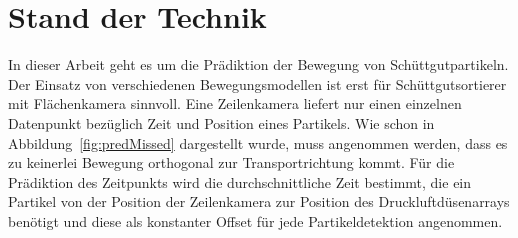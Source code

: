 \section{Stand der Technik}
\label{cap:relWork}








In dieser Arbeit geht es um die Prädiktion der Bewegung von Schüttgutpartikeln.
Der Einsatz von verschiedenen Bewegungsmodellen ist erst für Schüttgutsortierer mit Flächenkamera sinnvoll.
Eine Zeilenkamera liefert nur einen einzelnen Datenpunkt bezüglich Zeit und Position eines Partikels.
Wie schon in Abbildung~\ref{fig:predMissed} dargestellt wurde, muss angenommen werden, dass es zu keinerlei Bewegung orthogonal zur Transportrichtung kommt.
Für die Prädiktion des Zeitpunkts wird die durchschnittliche Zeit bestimmt, die ein Partikel von der Position der Zeilenkamera zur Position des Druckluftdüsenarrays benötigt 
und diese als konstanter Offset für jede Partikeldetektion angenommen.

